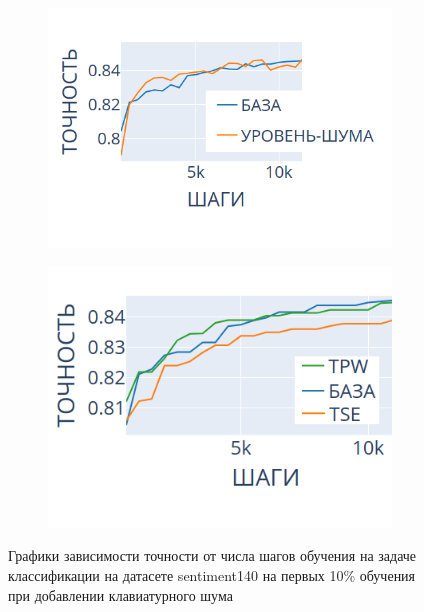 \documentclass{spbau-diploma}
\begin{document}
\begin{figure}[h]
	\centering
	\begin{subfigure}{.45\textwidth}
		\centering
		\includegraphics[scale=0.5]{keyboard_noise_level_short_prefix}
		\label{fig:s140_noise_lvl}
	\end{subfigure}
	\begin{subfigure}{.45\textwidth}
		\centering
		\includegraphics[scale=0.5]{keyboard_noise_TPW_win}
		\label{fig:s140_noise_tpw}
	\end{subfigure}
	\caption{Графики зависимости точности от числа шагов обучения на задаче классификации на датасете sentiment140 на первых 10\% обучения при добавлении клавиатурного шума}
	\label{fig:s140_noise}
\end{figure}
\end{document}

